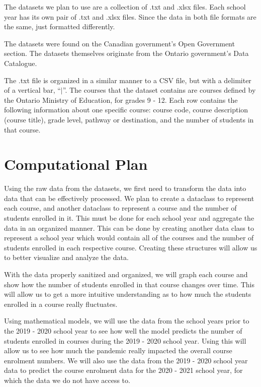 \documentclass[fontsize=11pt]{article}
\begin{document}
The datasets we plan to use are a collection of .txt and .xlsx files. Each school year has its own pair of .txt and .xlsx files. Since the data in both file formats are the same, just formatted differently.

The datasets were found on the Canadian government’s Open Government section. The datasets themselves originate from the Ontario government’s Data Catalogue.

The .txt file is organized in a similar manner to a CSV file, but with a delimiter of a vertical bar, “$\mid$”. The courses that the dataset contains are courses defined by the Ontario Ministry of Education, for grades 9 - 12. Each row contains the following information about one specific course: course code, course description (course title), grade level, pathway or destination, and the number of students in that course.

\section*{Computational Plan}  %

Using the raw data from the datasets, we first need to transform the data into data that can be effectively processed. We plan to create a dataclass to represent each course, and another dataclass to represent a course and the number of students enrolled in it. This must be done for each school year and aggregate the data in an organized manner. This can be done by creating another data class to represent a school year which would contain all of the courses and the number of students enrolled in each respective course. Creating these structures will allow us to better visualize and analyze the data.

With the data properly sanitized and organized, we will graph each course and show how the number of students enrolled in that course changes over time. This will allow us to get a more intuitive understanding as to how much the students enrolled in a course really fluctuates.

Using mathematical models, we will use the data from the school years prior to the 2019 - 2020 school year to see how well the model predicts the number of students enrolled in courses during the 2019 - 2020 school year. Using this will allow us to see how much the pandemic really impacted the overall course enrolment numbers. We will also use the data from the 2019 - 2020 school year data to predict the course enrolment data for the 2020 - 2021 school year, for which the data we do not have access to.
\end{document}
